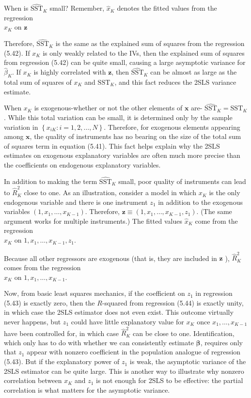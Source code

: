 \documentclass[10pt]{article}
\begin{document}
When is $\widehat{\mathrm{SST}}_{K}$ small? Remember, $\hat{x}_{K}$ denotes the fitted values from the regression\\
$x_{K}$ on $\mathbf{z}$

Therefore, $\widehat{\mathrm{SST}}_{K}$ is the same as the explained sum of squares from the regression (5.42). If $x_{K}$ is only weakly related to the IVs, then the explained sum of squares from regression (5.42) can be quite small, causing a large asymptotic variance for $\hat{\beta}_{K}$. If $x_{K}$ is highly correlated with $\mathbf{z}$, then $\widehat{\mathrm{SST}}_{K}$ can be almost as large as the total sum of squares of $x_{K}$ and $\mathrm{SST}_{K}$, and this fact reduces the 2SLS variance estimate.

When $x_{K}$ is exogenous-whether or not the other elements of $\mathbf{x}$ are- $\widehat{\mathrm{SST}}_{K}= \mathrm{SST}_{K}$. While this total variation can be small, it is determined only by the sample variation in $\left\{x_{i K}: i=1,2, \ldots, N\right\}$. Therefore, for exogenous elements appearing\\
among $\mathbf{x}$, the quality of instruments has no bearing on the size of the total sum of squares term in equation (5.41). This fact helps explain why the 2SLS estimates on exogenous explanatory variables are often much more precise than the coefficients on endogenous explanatory variables.

In addition to making the term $\widehat{\mathrm{SST}}_{K}$ small, poor quality of instruments can lead to $\hat{R}_{K}^{2}$ close to one. As an illustration, consider a model in which $x_{K}$ is the only endogenous variable and there is one instrument $z_{1}$ in addition to the exogenous variables $\left(1, x_{1}, \ldots, x_{K-1}\right)$. Therefore, $\mathbf{z} \equiv\left(1, x_{1}, \ldots, x_{K-1}, z_{1}\right)$. (The same argument works for multiple instruments.) The fitted values $\hat{x}_{K}$ come from the regression\\
$x_{K}$ on $1, x_{1}, \ldots, x_{K-1}, z_{1}$.

Because all other regressors are exogenous (that is, they are included in $\mathbf{z}$ ), $\hat{R}_{K}^{2}$ comes from the regression\\
$\hat{x}_{K}$ on $1, x_{1}, \ldots, x_{K-1}$.

Now, from basic least squares mechanics, if the coefficient on $z_{1}$ in regression (5.43) is exactly zero, then the $R$-squared from regression (5.44) is exactly unity, in which case the 2SLS estimator does not even exist. This outcome virtually never happens, but $z_{1}$ could have little explanatory value for $x_{K}$ once $x_{1}, \ldots, x_{K-1}$ have been controlled for, in which case $\hat{R}_{K}^{2}$ can be close to one. Identification, which only has to do with whether we can consistently estimate $\boldsymbol{\beta}$, requires only that $z_{1}$ appear with nonzero coefficient in the population analogue of regression (5.43). But if the explanatory power of $z_{1}$ is weak, the asymptotic variance of the 2SLS estimator can be quite large. This is another way to illustrate why nonzero correlation between $x_{K}$ and $z_{1}$ is not enough for 2SLS to be effective: the partial correlation is what matters for the asymptotic variance.
\end{document}
